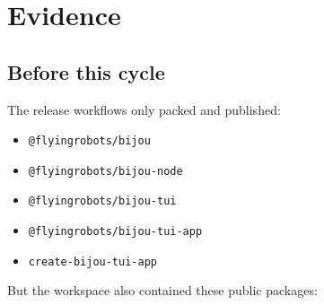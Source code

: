 \section{Evidence}\label{record-203-evidence}

\subsection{Before this cycle}\label{record-203-before-this-cycle}

The release workflows only packed and published:

\begin{itemize}
\tightlist
\item
  \texttt{@\allowbreak{}f\allowbreak{}l\allowbreak{}y\allowbreak{}i\allowbreak{}n\allowbreak{}g\allowbreak{}r\allowbreak{}o\allowbreak{}b\allowbreak{}o\allowbreak{}t\allowbreak{}s\allowbreak{}/\allowbreak{}b\allowbreak{}i\allowbreak{}j\allowbreak{}o\allowbreak{}u}
\item
  \texttt{@\allowbreak{}f\allowbreak{}l\allowbreak{}y\allowbreak{}i\allowbreak{}n\allowbreak{}g\allowbreak{}r\allowbreak{}o\allowbreak{}b\allowbreak{}o\allowbreak{}t\allowbreak{}s\allowbreak{}/\allowbreak{}b\allowbreak{}i\allowbreak{}j\allowbreak{}o\allowbreak{}u\allowbreak{}-\allowbreak{}n\allowbreak{}o\allowbreak{}d\allowbreak{}e}
\item
  \texttt{@\allowbreak{}f\allowbreak{}l\allowbreak{}y\allowbreak{}i\allowbreak{}n\allowbreak{}g\allowbreak{}r\allowbreak{}o\allowbreak{}b\allowbreak{}o\allowbreak{}t\allowbreak{}s\allowbreak{}/\allowbreak{}b\allowbreak{}i\allowbreak{}j\allowbreak{}o\allowbreak{}u\allowbreak{}-\allowbreak{}t\allowbreak{}u\allowbreak{}i}
\item
  \texttt{@\allowbreak{}f\allowbreak{}l\allowbreak{}y\allowbreak{}i\allowbreak{}n\allowbreak{}g\allowbreak{}r\allowbreak{}o\allowbreak{}b\allowbreak{}o\allowbreak{}t\allowbreak{}s\allowbreak{}/\allowbreak{}b\allowbreak{}i\allowbreak{}j\allowbreak{}o\allowbreak{}u\allowbreak{}-\allowbreak{}t\allowbreak{}u\allowbreak{}i\allowbreak{}-\allowbreak{}a\allowbreak{}p\allowbreak{}p}
\item
  \texttt{c\allowbreak{}r\allowbreak{}e\allowbreak{}a\allowbreak{}t\allowbreak{}e\allowbreak{}-\allowbreak{}b\allowbreak{}i\allowbreak{}j\allowbreak{}o\allowbreak{}u\allowbreak{}-\allowbreak{}t\allowbreak{}u\allowbreak{}i\allowbreak{}-\allowbreak{}a\allowbreak{}p\allowbreak{}p}
\end{itemize}

But the workspace also contained these public packages:

